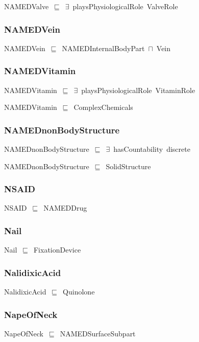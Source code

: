 \documentclass{article}
\begin{document}
NAMEDValve~\ensuremath{\sqsubseteq}~\ensuremath{\exists}~playsPhysiologicalRole~ValveRole~

\subsubsection*{NAMEDVein}

NAMEDVein~\ensuremath{\sqsubseteq}~NAMEDInternalBodyPart~\ensuremath{\sqcap}~Vein~

\subsubsection*{NAMEDVitamin}

NAMEDVitamin~\ensuremath{\sqsubseteq}~\ensuremath{\exists}~playsPhysiologicalRole~VitaminRole~

NAMEDVitamin~\ensuremath{\sqsubseteq}~ComplexChemicals~

\subsubsection*{NAMEDnonBodyStructure}

NAMEDnonBodyStructure~\ensuremath{\sqsubseteq}~\ensuremath{\exists}~hasCountability~discrete~

NAMEDnonBodyStructure~\ensuremath{\sqsubseteq}~SolidStructure~

\subsubsection*{NSAID}

NSAID~\ensuremath{\sqsubseteq}~NAMEDDrug~

\subsubsection*{Nail}

Nail~\ensuremath{\sqsubseteq}~FixationDevice~

\subsubsection*{NalidixicAcid}

NalidixicAcid~\ensuremath{\sqsubseteq}~Quinolone~

\subsubsection*{NapeOfNeck}

NapeOfNeck~\ensuremath{\sqsubseteq}~NAMEDSurfaceSubpart~
\end{document}

